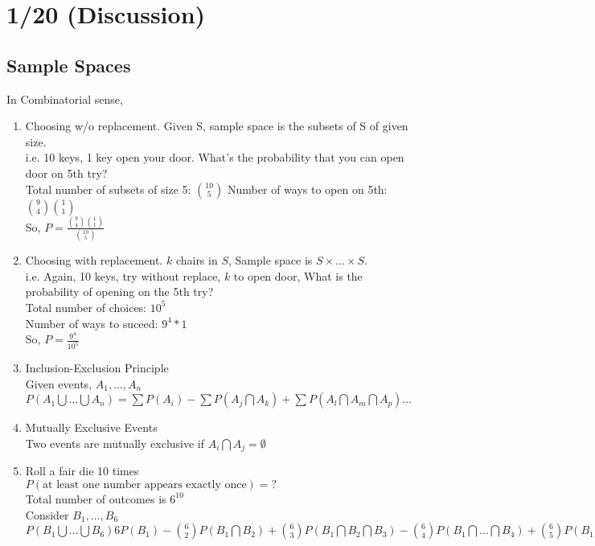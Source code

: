 \section*{1/20 (Discussion)}

  \subsection*{Sample Spaces}
    In Combinatorial sense,\\
    \begin{enumerate}
    \item Choosing w/o replacement. Given S, sample space is the subsets of S of
      given size.\\
      i.e. 10 keys, 1 key open your door. What's the probability that you can 
      open door on 5th try?\\
      Total number of subsets of size 5: $\binom{10}{5}$
      Number of ways to open on 5th: $\binom{9}{4}\binom{1}{1}$\\
      So, $P = \frac{\binom{9}{4}\binom{1}{1}}{\binom{10}{5}}$\\
    \item Choosing with replacement. $k$ chairs in $S$, Sample space is 
      $S \times \ldots \times S$.\\
      i.e. Again, 10 keys, try without replace, $k$ to open door, What is
      the probability of opening on the 5th try?\\
      Total number of choices: $10^5$\\
      Number of ways to suceed: $9^4 * 1$\\
      So, $P = \frac{9^4}{10^5}$\\
    \item Inclusion-Exclusion Principle\\
      Given events, $A_1, \ldots, A_n$\\
      $P(A_1 \bigcup \ldots \bigcup A_n) = \sum P(A_i) - \sum P(A_j \bigcap
      A_k) + \sum P(A_l \bigcap A_m \bigcap A_p) \ldots $\\
    \item Mutually Exclusive Events\\
      Two events are mutually exclusive if $A_i \bigcap A_j = \emptyset$
    \item Roll a fair die 10 times\\
      $P(\text{at least one number appears exactly once}) = ?$\\
      Total number of outcomes is $6^{10}$\\
      Consider $B_1, \ldots, B_6$\\
      $P(B_1 \bigcup \ldots \bigcup B_6) 6 P(B_1) - \binom{6}{2} P(B_1 \bigcap
      B_2) + \binom{6}{3}P(B_1 \bigcap B_2 \bigcap B_3) - \binom{6}{4} P(
      B_1 \bigcap \ldots \bigcap B_4) + \binom{6}{5} P(B_1 \bigcap \ldots 
      \bigcap B_5) - \binom{6}{6} P(B_1 \bigcap \ldots \bigcap B_6)$
    \end{enumerate}
